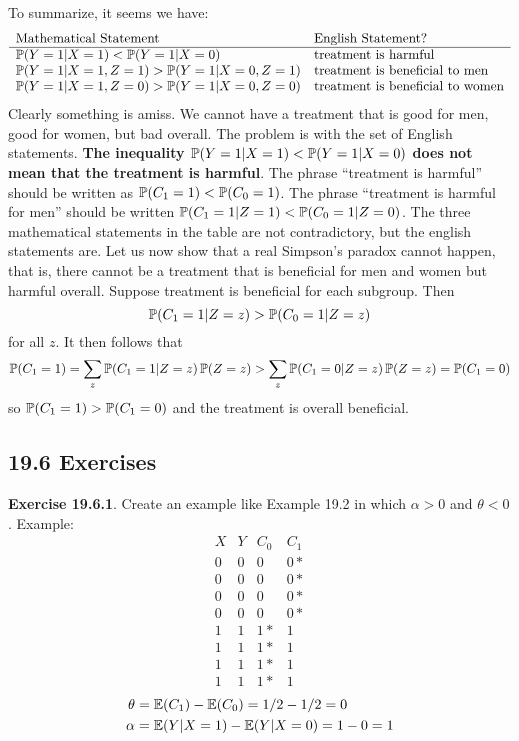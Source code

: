 To summarize, it seems we have:
\[
\begin{array}{ll}
\text{Mathematical Statement} & \text{English Statement?} \\
\hline
\operatorname{\mathbb{P}}(Y = 1 | X = 1) < \operatorname{\mathbb{P}}(Y = 1 | X = 0) & \text{treatment is harmful} \\
\operatorname{\mathbb{P}}(Y = 1 | X = 1, Z = 1) > \operatorname{\mathbb{P}}(Y = 1 | X = 0, Z = 1) & \text{treatment is beneficial to men} \\
\operatorname{\mathbb{P}}(Y = 1 | X = 1, Z = 0) > \operatorname{\mathbb{P}}(Y = 1 | X = 0, Z = 0) & \text{treatment is beneficial to women}
\end{array}
\]
Clearly something is amiss. We cannot have a treatment that is good for men, good for women, but bad overall. The problem is with the set of English statements. \textbf{The inequality \(\operatorname{\mathbb{P}}(Y = 1 | X = 1) < \operatorname{\mathbb{P}}(Y = 1 | X = 0)\) does not mean that the treatment is harmful}.
The phrase ``treatment is harmful'' should be written as \(\operatorname{\mathbb{P}}(C_{1} = 1) < \operatorname{\mathbb{P}}(C_{0} = 1)\). The phrase ``treatment is harmful for men'' should be written \(\operatorname{\mathbb{P}}(C_{1} = 1 | Z = 1) < \operatorname{\mathbb{P}}(C_{0} = 1 | Z = 0)\). The three mathematical statements in the table are not contradictory, but the english statements are.
Let us now show that a real Simpson's paradox cannot happen, that is, there cannot be a treatment that is beneficial for men and women but harmful overall. Suppose treatment is beneficial for each subgroup. Then
\[
\operatorname{\mathbb{P}}(C_{1} = 1 | Z = z) > \operatorname{\mathbb{P}}(C_{0} = 1 | Z = z)
\]
for all \(z\). It then follows that
\[
\operatorname{\mathbb{P}}(C_{1} = 1) = \sum_z \operatorname{\mathbb{P}}(C_{1} = 1 | Z = z) \operatorname{\mathbb{P}}(Z = z) > \sum_z \operatorname{\mathbb{P}}(C_{1} = 0 | Z = z) \operatorname{\mathbb{P}}(Z = z) = \operatorname{\mathbb{P}}(C_{1} = 0)
\]
so \(\operatorname{\mathbb{P}}(C_{1} = 1) > \operatorname{\mathbb{P}}(C_{1} = 0)\) and the treatment is
overall beneficial.

\subsection*{19.6 Exercises}

\textbf{Exercise 19.6.1}. Create an example like Example 19.2 in which \(\alpha > 0\) and \(\theta < 0\).
Example:
\[
\begin{array}{cccc}
X & Y & C_{0} & C_{1} \\
\hline
0 & 0 & 0 & 0* \\
0 & 0 & 0 & 0* \\
0 & 0 & 0 & 0* \\
0 & 0 & 0 & 0* \\
\hline
1 & 1 & 1* & 1 \\
1 & 1 & 1* & 1 \\
1 & 1 & 1* & 1 \\
1 & 1 & 1* & 1
\end{array}
\]
\begin{align*}
\theta &= \operatorname{\mathbb{E}}(C_{1}) - \operatorname{\mathbb{E}}(C_{0}) = 1/2 - 1/2 = 0 \\
\alpha &= \operatorname{\mathbb{E}}(Y | X = 1) - \operatorname{\mathbb{E}}(Y | X = 0) = 1 - 0 = 1
\end{align*}

